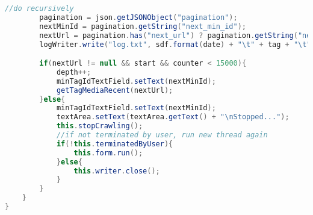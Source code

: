 \begin{lstlisting}[language=Java,basicstyle=\tiny,caption=InstagramCrawler.java]
        //do recursively
        pagination = json.getJSONObject("pagination");
        nextMinId = pagination.getString("next_min_id");
        nextUrl = pagination.has("next_url") ? pagination.getString("next_url") : null;
        logWriter.write("log.txt", sdf.format(date) + "\t" + tag + "\t" + nextMinId + "\n");

        if(nextUrl != null && start && counter < 15000){ 
            depth++;
            minTagIdTextField.setText(nextMinId);
            getTagMediaRecent(nextUrl);
        }else{
            minTagIdTextField.setText(nextMinId);
            textArea.setText(textArea.getText() + "\nStopped...");
            this.stopCrawling();
            //if not terminated by user, run new thread again
            if(!this.terminatedByUser){
                this.form.run();
            }else{
                this.writer.close();
            }
        }
    }
}
\end{lstlisting}